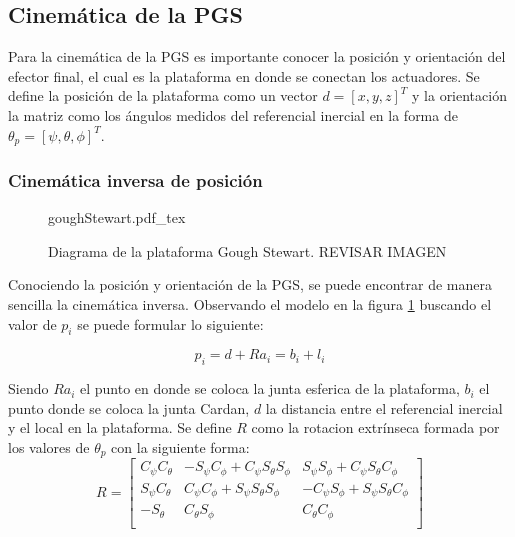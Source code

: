 \subsection{Cinemática de la PGS}
Para la cinemática de la PGS es importante conocer la posición y orientación del 
efector final, el cual es la plataforma en donde se conectan los actuadores. Se 
define la posición de la plataforma como un vector $d = [x,y,z]^T$ y la orientación 
la matriz como los ángulos medidos del referencial inercial en la forma de 
$\theta_p = [\psi,\theta,\phi]^T$.

\subsubsection{Cinemática inversa de posición}

\begin{figure}[ht]
    \centering
    {goughStewart.pdf_tex}
    \caption{Diagrama de la plataforma Gough Stewart. REVISAR IMAGEN}
    \label{fig: gough stewart diagram}
\end{figure}

Conociendo la posición y orientación de la PGS, se puede encontrar de manera sencilla 
la cinemática inversa. Observando el modelo en la figura \ref{fig: gough stewart diagram} 
buscando el valor de $p_i$ se puede formular lo siguiente:

\begin{equation} \label{equ:plat_grl}
p_i = d + Ra_i = b_i + l_i
\end{equation}

Siendo $Ra_i$ el punto en donde se coloca la junta esferica de la plataforma, $b_i$ 
el punto donde se coloca la junta Cardan,  $d$ la distancia entre el referencial 
inercial y el local en la plataforma. Se define $R$ como la rotacion extrínseca formada 
por los valores de $\theta_p$ con la siguiente forma:
\begin{equation} \label{equ:Mrot-P}
R = \begin{bmatrix}
C_\psi C_\theta & -S_\psi C_\phi + C_\psi S_\theta S_\phi & S_\psi S_\phi + C_\psi S_\theta C_\phi\\
S_\psi C_\theta & C_\psi C_\phi + S_\psi S_\theta S_\phi & -C_\psi S_\phi + S_\psi S_\theta C_\phi\\
-S_\theta & C_\theta S_\phi & C_\theta C_\phi\\
\end{bmatrix}
\end{equation}


